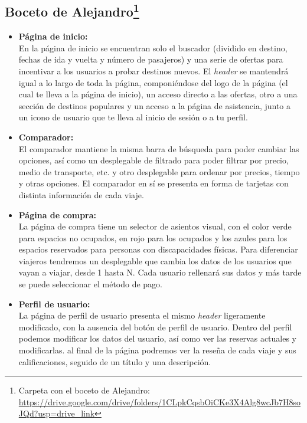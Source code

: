 \subsection[Boceto de Alejandro]{Boceto de Alejandro\footnote{Carpeta con el boceto de Alejandro: \url{https://drive.google.com/drive/folders/1CLpkCqsbOiCKe3X4Alg8wcJb7H8soJQd?usp=drive_link}}}

\begin{itemize}
    \item\textbf{Página de inicio:} \\ En la página de inicio se encuentran solo el buscador (dividido en destino, fechas de ida y vuelta y número de pasajeros) y una serie de ofertas para incentivar a los usuarios a probar destinos nuevos. El \textit{header} se mantendrá igual a lo largo de toda la página, componiéndose del logo de la página (el cual te lleva a la página de inicio), un acceso directo a las ofertas, otro a una sección de destinos populares y un acceso a la página de asistencia, junto a un icono de usuario que te lleva al inicio de sesión o a tu perfil. 
    \item\textbf{Comparador:} \\ El comparador mantiene la misma barra de búsqueda para poder cambiar las opciones, así como un desplegable de filtrado para poder filtrar por precio, medio de transporte, etc. y otro desplegable para ordenar por precios, tiempo y otras opciones. El comparador en sí se presenta en forma de tarjetas con distinta información de cada viaje.
    \item\textbf{Página de compra:} \\ La página de compra tiene un selector de asientos visual, con el color verde para espacios no ocupados, en rojo para los ocupados y los azules para los espacios reservados para personas con discapacidades físicas. Para diferenciar viajeros tendremos un desplegable que cambia los datos de los usuarios que vayan a viajar, desde 1 hasta N. Cada usuario rellenará sus datos y más tarde se puede seleccionar el método de pago.
    \item\textbf{Perfil de usuario:} \\ La página de perfil de usuario presenta el mismo \textit{header} ligeramente modificado, con la ausencia del botón de perfil de usuario. Dentro del perfil podemos modificar los datos del usuario, así como ver las reservas actuales y modificarlas. al final de la página podremos ver la reseña de cada viaje y sus calificaciones, seguido de un título y una descripción.
\end{itemize}



